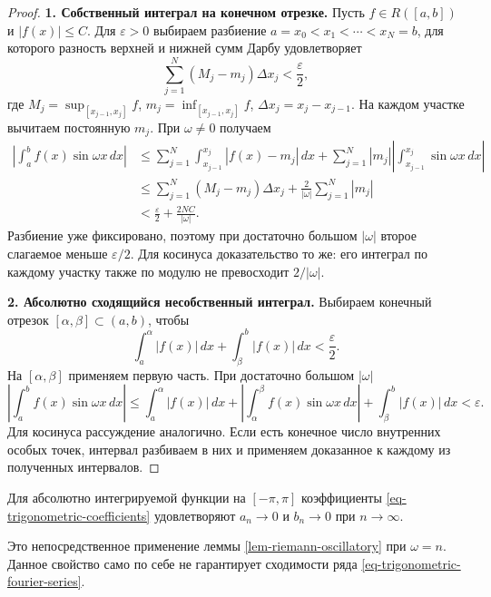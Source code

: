 \begin{proof}

\textbf{1. Собственный интеграл на конечном отрезке.}
Пусть \(f\in R([a,b])\) и \(|f(x)|\le C\). Для \(\varepsilon>0\) выбираем разбиение \(a=x_0<x_1<\cdots<x_N=b\), для которого разность верхней и нижней сумм Дарбу удовлетворяет
\[
\sum_{j=1}^N(M_j-m_j)\Delta x_j<\frac{\varepsilon}{2},
\]
где \(M_j=\sup_{[x_{j-1},x_j]}f\), \(m_j=\inf_{[x_{j-1},x_j]}f\), \(\Delta x_j=x_j-x_{j-1}\).
На каждом участке вычитаем постоянную \(m_j\). При \(\omega\ne0\) получаем
\[
\begin{aligned}
\left|\int_a^b f(x)\sin\omega x\,dx\right|
&\le\sum_{j=1}^N\int_{x_{j-1}}^{x_j}|f(x)-m_j|\,dx
+\sum_{j=1}^N|m_j|\left|\int_{x_{j-1}}^{x_j}\sin\omega x\,dx\right|\\
&\le\sum_{j=1}^N(M_j-m_j)\Delta x_j
+\frac{2}{|\omega|}\sum_{j=1}^N|m_j|\\
&<\frac{\varepsilon}{2}+\frac{2NC}{|\omega|}.
\end{aligned}
\]
Разбиение уже фиксировано, поэтому при достаточно большом \(|\omega|\) второе слагаемое меньше \(\varepsilon/2\). Для косинуса доказательство то же: его интеграл по каждому участку также по модулю не превосходит \(2/|\omega|\).

\textbf{2. Абсолютно сходящийся несобственный интеграл.}
Выбираем конечный отрезок \([\alpha,\beta]\subset(a,b)\), чтобы
\[
\int_a^\alpha|f(x)|\,dx+\int_\beta^b|f(x)|\,dx<\frac{\varepsilon}{2}.
\]
На \([\alpha,\beta]\) применяем первую часть. При достаточно большом \(|\omega|\)
\[
\left|\int_a^b f(x)\sin\omega x\,dx\right|
\le\int_a^\alpha|f(x)|\,dx
+\left|\int_\alpha^\beta f(x)\sin\omega x\,dx\right|
+\int_\beta^b|f(x)|\,dx<\varepsilon.
\]
Для косинуса рассуждение аналогично. Если есть конечное число внутренних особых точек, интервал разбиваем в них и применяем доказанное к каждому из полученных интервалов.

\end{proof}

\begin{cor}\label{cor-fourier-coefficients-zero}

Для абсолютно интегрируемой функции на \([-\pi,\pi]\) коэффициенты \eqref{eq-trigonometric-coefficients} удовлетворяют \(a_n\to0\) и \(b_n\to0\) при \(n\to\infty\).

\end{cor}

Это непосредственное применение леммы \ref{lem-riemann-oscillatory} при \(\omega=n\). Данное свойство само по себе не гарантирует сходимости ряда \eqref{eq-trigonometric-fourier-series}.
